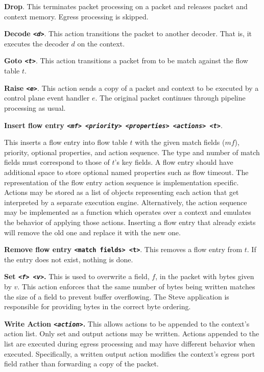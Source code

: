 \textbf{Drop}. This terminates packet processing on a packet and releases packet and context memory. Egress processing is skipped.

\textbf{Decode \emph{\texttt{<d>}}}. This action transitions the packet to another decoder. That is, it executes the decoder $d$ on the context.

\textbf{Goto \emph{\texttt{<t>}}}. This action transitions a packet from to be match against the flow table $t$. 

\textbf{Raise \emph{\texttt{<e>}}}. This action sends a copy of a packet and context to
be executed by a control plane event handler $e$. 
The original packet continues through pipeline processing as usual.

\textbf{Insert flow entry \emph{\texttt{<mf> <priority> <properties> <actions> <t>}}}. 

This inserts a flow entry into flow table $t$ with the given match fields ($mf$), priority, optional properties, and action sequence. The type and number of match
fields must correspond to those of $t$'s key fields. A flow entry should have additional space to store optional named properties such as flow timeout. The representation of the flow entry action sequence is implementation specific. Actions may be stored as a list of objects representing each action that get interpreted by a separate execution engine. Alternatively, the action sequence may be implemented as a function which operates over a context and emulates the behavior of applying those actions. 
Inserting a flow entry that already exists will remove the old one and replace it with the new one. 

\textbf{Remove flow entry \texttt{<match fields> <t>}}. This removes a flow entry from $t$.
If the entry does not exist, nothing is done.

\textbf{Set \emph{\texttt{<f> <v>}}.} This is used to overwrite a field, $f$, in the packet with bytes given by $v$. This action enforces that the same number of bytes being written matches the size of a field to prevent buffer overflowing. The Steve application is responsible for providing bytes in the correct byte ordering.

\textbf{Write Action \emph{\texttt{<action>}}.} This allows actions to be appended to the context's
action list. Only set and output actions may be written. Actions appended to the list are executed during egress processing and may have different behavior when executed. Specifically, a written output action modifies the context's egress port field rather than forwarding a copy of the packet.

